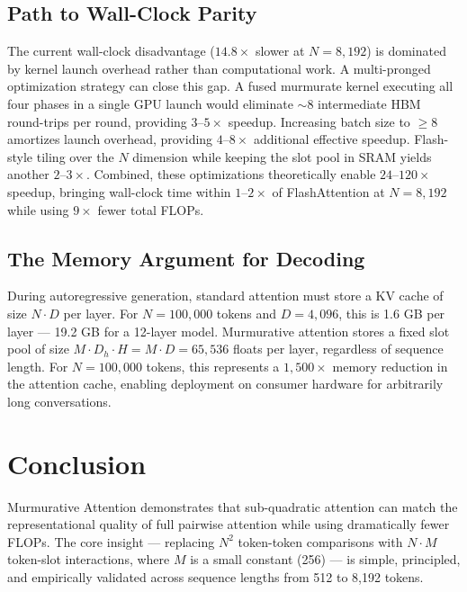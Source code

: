 \documentclass{article}
\begin{document}
\subsection{Path to Wall-Clock Parity}

The current wall-clock disadvantage ($14.8\times$ slower at $N=8{,}192$) is dominated by kernel launch overhead rather than computational work. A multi-pronged optimization strategy can close this gap. A fused murmurate kernel executing all four phases in a single GPU launch would eliminate $\sim\!8$ intermediate HBM round-trips per round, providing $3$--$5\times$ speedup. Increasing batch size to $\geq 8$ amortizes launch overhead, providing $4$--$8\times$ additional effective speedup. Flash-style tiling over the $N$ dimension while keeping the slot pool in SRAM yields another $2$--$3\times$. Combined, these optimizations theoretically enable $24$--$120\times$ speedup, bringing wall-clock time within $1$--$2\times$ of FlashAttention at $N=8{,}192$ while using $9\times$ fewer total FLOPs.

\subsection{The Memory Argument for Decoding}

During autoregressive generation, standard attention must store a KV cache of size $N \cdot D$ per layer. For $N = 100{,}000$ tokens and $D = 4{,}096$, this is 1.6 GB per layer — 19.2 GB for a 12-layer model. Murmurative attention stores a fixed slot pool of size $M \cdot D_h \cdot H = M \cdot D = 65{,}536$ floats per layer, regardless of sequence length. For $N = 100{,}000$ tokens, this represents a $1{,}500\times$ memory reduction in the attention cache, enabling deployment on consumer hardware for arbitrarily long conversations.

\section{Conclusion}

Murmurative Attention demonstrates that sub-quadratic attention can match the representational quality of full pairwise attention while using dramatically fewer FLOPs. The core insight — replacing $N^2$ token-token comparisons with $N \cdot M$ token-slot interactions, where $M$ is a small constant (256) — is simple, principled, and empirically validated across sequence lengths from 512 to 8{,}192 tokens.
\end{document}
